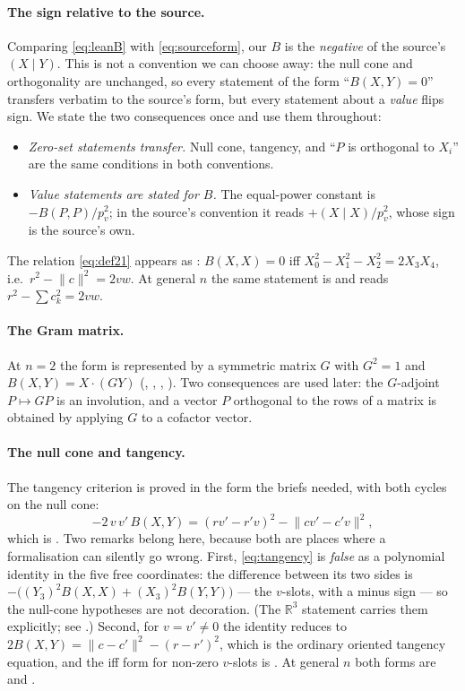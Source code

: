 \documentclass[11pt]{article}
\theoremstyle{definition}
\theoremstyle{remark}
\newcommand{\RR}{\mathbb{R}}
\begin{document}
\paragraph{The sign relative to the source.} Comparing \eqref{eq:leanB} with \eqref{eq:sourceform},
our $B$ is the \emph{negative} of the source's $(X\mid Y)$. This is not a convention we can choose
away: the null cone and orthogonality are unchanged, so every statement of the form ``$B(X,Y)=0$''
transfers verbatim to the source's form, but every statement about a \emph{value} flips sign. We
state the two consequences once and use them throughout:
\begin{itemize}
\item \emph{Zero-set statements transfer.} Null cone, tangency, and ``$P$ is orthogonal to $X_i$''
are the same conditions in both conventions.
\item \emph{Value statements are stated for $B$.} The equal-power constant is
$-B(P,P)/p_v^2$; in the source's convention it reads $+(X\mid X)/p_v^2$, whose sign is the source's
own.
\end{itemize}
The relation \eqref{eq:def21} appears as : $B(X,X)=0$ iff
$X_0^2-X_1^2-X_2^2=2X_3X_4$, i.e.\ $r^2-\lVert c\rVert^2=2vw$. At general $n$ the same statement is
 and reads $r^2-\sum c_k^2=2vw$.

\paragraph{The Gram matrix.} At $n=2$ the form is represented by a symmetric matrix $G$ with
$G^2=1$ and $B(X,Y)=X\cdot(GY)$ (, ,
, ). Two consequences are used later: the
$G$-adjoint $P\mapsto GP$ is an involution, and a vector $P$ orthogonal to the rows of a matrix is
obtained by applying $G$ to a cofactor vector.

\paragraph{The null cone and tangency.} The tangency criterion is proved in the form the briefs
needed, with both cycles on the null cone:
\begin{equation}\label{eq:tangency}
-2\,v\,v'\,B(X,Y)=(rv'-r'v)^2-\lVert cv'-c'v\rVert^2 ,
\end{equation}
which is . Two remarks belong here, because both are places where a
formalisation can silently go wrong. First, \eqref{eq:tangency} is \emph{false} as a polynomial
identity in the five free coordinates: the difference between its two sides is
$-\bigl((Y_3)^2B(X,X)+(X_3)^2B(Y,Y)\bigr)$ --- the $v$-slots, with a minus sign --- so the
null-cone hypotheses are not decoration. (The $\RR^3$
statement carries them explicitly; see .) Second, for
$v=v'\neq0$ the identity reduces to $2B(X,Y)=\lVert c-c'\rVert^2-(r-r')^2$, which is the ordinary
oriented tangency equation, and the iff form for non-zero $v$-slots is
. At general $n$ both forms are
 and .
\end{document}
